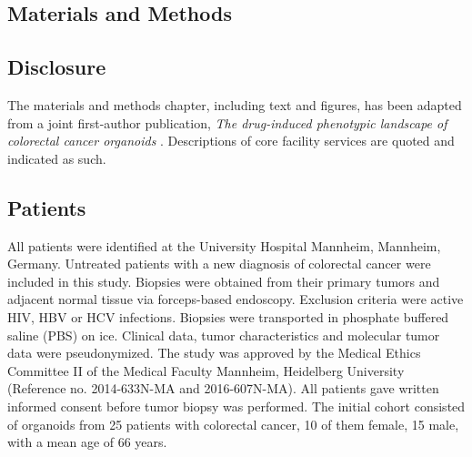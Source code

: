 \begin{flushleft}

\chapter{Materials and Methods}

\section{Disclosure}
The materials and methods chapter, including text and figures, has been adapted from a joint first-author publication, \textit{The drug-induced phenotypic landscape of colorectal cancer organoids} \parencite{betgeDruginducedPhenotypicLandscape2022}. Descriptions of core facility services are quoted and indicated as such.

\section{Patients}
All patients were identified at the University Hospital Mannheim, Mannheim, Germany. Untreated patients with a new diagnosis of colorectal cancer were included in this study. Biopsies were obtained from their primary tumors and adjacent normal tissue via forceps-based endoscopy. Exclusion criteria were active HIV, HBV or HCV infections. Biopsies were transported in phosphate buffered saline (PBS) on ice. Clinical data, tumor characteristics and molecular tumor data were pseudonymized. The study was approved by the Medical Ethics Committee II of the Medical Faculty Mannheim, Heidelberg University (Reference no. 2014-633N-MA and 2016-607N-MA). All patients gave written informed consent before tumor biopsy was performed. The initial cohort consisted of organoids from 25 patients with colorectal cancer, 10 of them female, 15 male, with a mean age of 66 years.


\end{flushleft}
